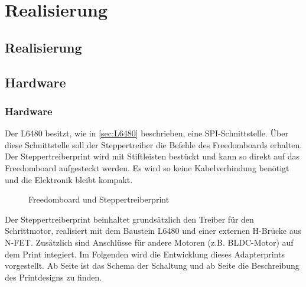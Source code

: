 \ifSTANDALONE
\section{Realisierung}
\fi
\ifEMBED
\subsection{Realisierung}
\fi 
    \ifSTANDALONE
    \subsection{Hardware} \label{ch:Hardware}
    \fi
    \ifEMBED
    \subsubsection{Hardware} \label{ch:Hardware}
    \fi
    Der L6480 besitzt, wie in \autoref{sec:L6480} beschrieben, eine 
    SPI-Schnittstelle. Über diese Schnittstelle soll der Steppertreiber die 
    Befehle des Freedomboards erhalten. Der Steppertreiberprint wird mit 
    Stiftleisten bestückt und kann so direkt auf das Freedomboard aufgesteckt 
    werden. Es wird so keine Kabelverbindung benötigt und die Elektronik 
    bleibt kompakt.
    \begin{figure}[h]
        \centering
        \caption{Freedomboard und Steppertreiberprint}
        \label{fig:Steppertreiber}
    \end{figure}
    \newline
    Der Steppertreiberprint beinhaltet grundsätzlich den Treiber für den 
    Schrittmotor, realisiert mit dem Baustein L6480 und einer externen 
    H-Brücke aus N-FET. Zusätzlich sind Anschlüsse für andere Motoren (z.B.  
    BLDC-Motor) auf dem Print integiert. Im Folgenden wird die Entwicklung 
    dieses Adapterprints vorgestellt. Ab Seite \pageref{sec:Schema} ist das 
    Schema der Schaltung und ab Seite \pageref{sec:PrintDesign} die 
    Beschreibung des Printdesigns zu finden. 
    \ifSTANDALONE
